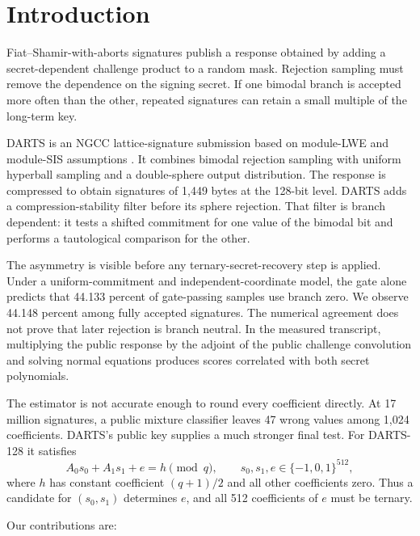 \documentclass[11pt,a4paper]{article}
\begin{document}
\section{Introduction}

Fiat--Shamir-with-aborts signatures publish a response obtained by adding a
secret-dependent challenge product to a random mask.  Rejection sampling must
remove the dependence on the signing secret.  If one bimodal branch is
accepted more often than the other, repeated signatures can retain a small
multiple of the long-term key.

DARTS is an NGCC lattice-signature submission based on module-LWE and
module-SIS assumptions \cite{DARTS}.  It combines bimodal rejection sampling
\cite{DucasEtAl} with uniform hyperball sampling and a double-sphere output
distribution.  The response is compressed to obtain signatures of 1,449
bytes at the 128-bit level.  DARTS adds a compression-stability filter before
its sphere rejection.  That filter is branch dependent: it tests a shifted
commitment for one value of the bimodal bit and performs a tautological
comparison for the other.

The asymmetry is visible before any ternary-secret-recovery step is applied.
Under a uniform-commitment and independent-coordinate model, the gate alone
predicts that 44.133 percent of gate-passing samples use branch zero.  We
observe 44.148 percent among fully accepted signatures.  The numerical
agreement does not prove that later rejection is branch neutral.  In the
measured transcript, multiplying the public response by the adjoint of the
public challenge convolution and solving normal equations produces scores
correlated with both secret polynomials.

The estimator is not accurate enough to round every coefficient directly.
At 17 million signatures, a public mixture classifier leaves 47 wrong values
among 1,024 coefficients.  DARTS's public key supplies a much stronger final
test.  For DARTS-128 it satisfies
\[
             A_0s_0+A_1s_1+e=h\pmod q,
             \qquad s_0,s_1,e\in\{-1,0,1\}^{512},
\]
where $h$ has constant coefficient $(q+1)/2$ and all other coefficients zero.
Thus a candidate for $(s_0,s_1)$ determines $e$, and all 512 coefficients of
$e$ must be ternary.

Our contributions are:
\end{document}
